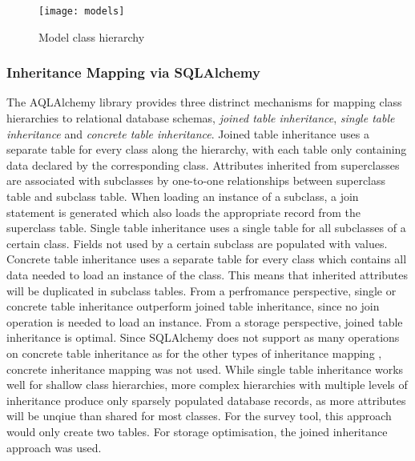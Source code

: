         \begin{figure}
            \centering
            \texttt{[image: models]}
            \caption{Model class hierarchy}
            \label{fig:model-dia}
        \end{figure}

    \subsubsection{Inheritance Mapping via SQLAlchemy}
    \label{section:implementation:inheritance-mapping}
        The AQLAlchemy library provides three distrinct mechanisms
        for mapping class hierarchies to relational database schemas,
        \textit{joined table inheritance}, \textit{single table inheritance}
        and \textit{concrete table inheritance}.
        Joined table inheritance uses a separate table for every
        class along the hierarchy, with each table only
        containing data declared by the corresponding class.
        Attributes inherited from superclasses are associated
        with subclasses by one-to-one relationships between
        superclass table and subclass table. When loading
        an instance of a subclass, a join statement is generated
        which also loads the appropriate record from the superclass
        table. Single table inheritance uses a single table
        for all subclasses of a certain class. Fields
        not used by a certain subclass are populated with 
        values. Concrete table inheritance uses a separate table for
        every class which contains all data needed to load an
        instance of the class. This means that inherited attributes
        will be duplicated in subclass tables.
        From a perfromance perspective, single or concrete table
        inheritance outperform joined table inheritance, since
        no join operation is needed to load an instance.
        From a storage perspective, joined table inheritance is
        optimal. Since SQLAlchemy does not support as many
        operations on concrete table inheritance as for the
        other types of inheritance mapping \cite{sqla-inheritance}, concrete inheritance
        mapping was not used. While single table inheritance
        works well for shallow class hierarchies, more
        complex hierarchies with multiple levels of inheritance
        produce only sparsely populated database records, as more attributes
        will be unqiue than shared for most classes.
        For the survey tool, this approach would only create
        two tables. For storage optimisation, the joined
        inheritance approach was used.

